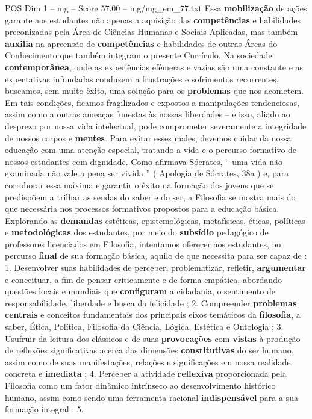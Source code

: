 \begin{textsample}{POS Dim 1 – mg – Score 57.00 – mg/mg\_em\_77.txt}
Essa \textbf{mobilização} de ações garante aos estudantes não apenas a aquisição das \textbf{competências} e habilidades preconizadas pela Área de Ciências Humanas e Sociais Aplicadas, mas também \textbf{auxilia} na apreensão de \textbf{competências} e habilidades de outras Áreas do Conhecimento que também integram o presente Currículo.
Na sociedade \textbf{contemporânea}, onde as experiências efêmeras e vazias são uma constante e as expectativas infundadas conduzem a frustrações e sofrimentos recorrentes, buscamos, sem muito êxito, uma solução para os \textbf{problemas} que nos acometem.
Em tais condições, ficamos fragilizados e expostos a manipulações tendenciosas, assim como a outras ameaças funestas às nossas liberdades – e isso, aliado ao desprezo por nossa vida intelectual, pode comprometer severamente a integridade de nossos corpos e \textbf{mentes}.
Para evitar esses males, devemos cuidar da nossa educação com uma atenção especial, tratando a vida e o percurso formativo de nossos estudantes com dignidade.
Como afirmava Sócrates, “ uma vida não examinada não vale a pena ser vivida ” ( Apologia de Sócrates, 38a ) e, para corroborar essa máxima e garantir o êxito na formação dos jovens que se predispõem a trilhar as sendas do saber e do ser, a Filosofia se mostra mais do que necessária nos processos formativos propostos para a educação básica.
Explorando as \textbf{demandas} estéticas, epistemológicas, metafísicas, éticas, políticas e \textbf{metodológicas} dos estudantes, por meio do \textbf{subsídio} pedagógico de professores licenciados em Filosofia, intentamos oferecer aos estudantes, no percurso \textbf{final} de sua formação básica, aquilo de que necessita para ser capaz de : 1.
Desenvolver suas habilidades de perceber, problematizar, refletir, \textbf{argumentar} e conceituar, a fim de pensar criticamente e de forma empática, abordando questões locais e mundiais que \textbf{configuram} a cidadania, o sentimento de responsabilidade, liberdade e busca da felicidade ; 2.
Compreender \textbf{problemas} \textbf{centrais} e conceitos fundamentais dos principais eixos temáticos da \textbf{filosofia}, a saber, Ética, Política, Filosofia da Ciência, Lógica, Estética e Ontologia ; 3.
Usufruir da leitura dos clássicos e de suas \textbf{provocações} com \textbf{vistas} à produção de reflexões significativas acerca das dimensões \textbf{constitutivas} do ser humano, assim como de suas manifestações, relações e significações em nossa realidade concreta e \textbf{imediata} ; 4.
Perceber a atividade \textbf{reflexiva} proporcionada pela Filosofia como um fator dinâmico intrínseco ao desenvolvimento histórico humano, assim como sendo uma ferramenta racional \textbf{indispensável} para a sua formação integral ; 5.

\end{textsample}
